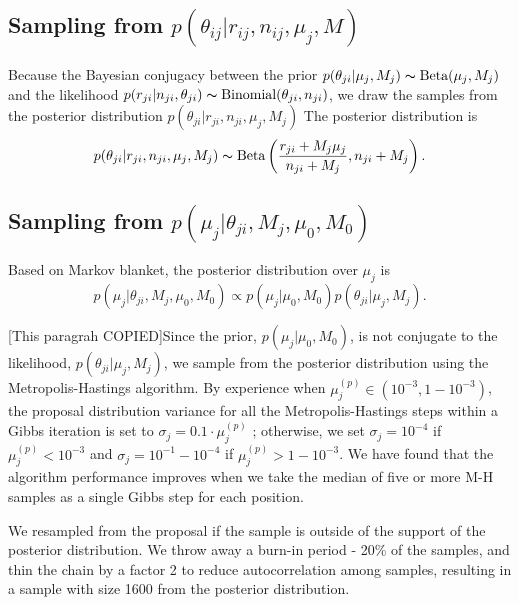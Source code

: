 \documentclass[11pt,reqno]{amsart}
\begin{document}
\subsection{Sampling from $p \left( \theta_{ij} |r_{ij},n_{ij},\mu_j,M \right)$}

Because the Bayesian conjugacy between the prior
$p(\theta_{ji} | \mu_j, M_j) \thicksim \text{Beta}(\mu_j, M_j)$
and the likelihood
$p(r_{ji} | n_{ji}, \theta_{ji}) \thicksim \text{Binomial}(\theta_{ji}, n_{ji})$,
we draw the samples from the posterior distribution
$p(\theta_{ji} | r_{ji}, n_{ji}, \mu_j, M_j)$
The posterior distribution is
\begin{equation}
	p(\theta_{ji} | r_{ji}, n_{ji}, \mu_j, M_j) \thicksim \text{Beta}\left( \frac{r_{ji} + M_j \mu_j}{n_{ji} + M_j} , n_{ji} + M_j\right).
\end{equation}

\subsection{Sampling from $p \left( \mu_j |\theta_{ji},M_j,\mu_0,M_0\right)$}
Based on Markov blanket, the posterior distribution over $\mu_j$ is
\begin{equation}
	p( \mu_j | \theta_{ji}, M_j, \mu_0, M_0 ) \propto p(\mu_j | \mu_0, M_0) p(\theta_{ji} | \mu_j, M_j).
\end{equation}

[This paragrah COPIED]Since the prior, $p(\mu_j | \mu_0, M_0)$, is not conjugate to the likelihood, $p(\theta_{ji} | \mu_j, M_j)$, we sample from the posterior distribution using the Metropolis-Hastings algorithm.
By experience when $\mu_j^{(p)} \in (10^{-3},1-10^{-3})$, the proposal distribution variance for all the Metropolis-Hastings steps within a Gibbs iteration is set to $\sigma_j = 0.1 \cdot \mu_j^{(p)}$ ;
otherwise, we set $\sigma_j = 10^{-4}$ if $\mu_j^{(p)}< 10^{-3}$ and $\sigma_j = 10^{-1}-10^{-4}$ if $\mu_j^{(p)}>1-10^{-3}$.
We have found that the algorithm performance improves when we take the median of five or more M-H samples as a single Gibbs step for each position.

We resampled from the proposal if the sample is outside of the support of the posterior distribution.
We throw away a burn-in period - 20\% of the samples, and thin the chain by a factor 2 to reduce autocorrelation among samples, resulting in a sample with size 1600 from the posterior distribution.
\end{document}
